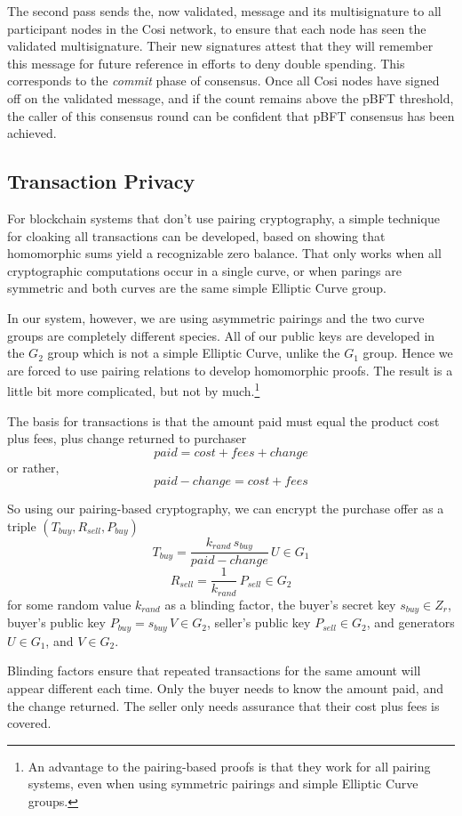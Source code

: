 \documentclass{yellowpaper}
\begin{document}
The second pass sends the, now validated, message and its multisignature to all participant nodes in the Cosi network, to ensure that each node has seen the validated multisignature. Their new signatures attest that they will remember this message for future reference in efforts to deny double spending. This corresponds to the {\em{commit}} phase of consensus. Once all Cosi nodes have signed off on the validated message, and if the count remains above the pBFT threshold, the caller of this consensus round can be confident that pBFT consensus has been achieved.
\subsection{Transaction Privacy}
For blockchain systems that don't use pairing cryptography, a simple technique for cloaking all transactions can be developed, based on showing that homomorphic sums yield a recognizable zero balance. That only works when all cryptographic computations occur in a single curve, or when parings are symmetric and both curves are the same simple Elliptic Curve group.

In our system, however, we are using asymmetric pairings and the two curve groups are completely different species. All of our public keys are developed in the $G_2$ group which is not a simple Elliptic Curve, unlike the $G_1$ group. Hence we are forced to use pairing relations to develop homomorphic proofs. The result is a little bit more complicated, but not by much.\footnote{An advantage to the pairing-based proofs is that they work for all pairing systems, even when using symmetric pairings and simple Elliptic Curve groups.}

The basis for transactions is that the amount paid must equal the product cost plus fees, plus change returned to purchaser
$$ {paid} = {cost} + {fees} + {change}$$
or rather, 
$$ {paid} - {change} = {cost} + {fees}$$

So using our pairing-based cryptography, we can encrypt the purchase offer as a triple 
$(T_{buy},R_{sell}, P_{buy})$
$$ T_{buy} = \frac{k_{rand} \, s_{buy}}{paid - change} \, U \in G_1$$
$$ R_{sell} = \frac{1}{k_{rand}}\,P_{sell} \in G_2$$
for some random value $k_{rand}$ as a blinding factor, the buyer's secret key $s_{buy} \in Z_r$, buyer's public key $P_{buy} = s_{buy} \, V \in G_2$,  seller's public key $P_{sell} \in G_2$, and generators $U \in G_1$, and $V \in G_2$.

Blinding factors ensure that repeated transactions for the same amount will appear different each time. Only the buyer needs to know the amount paid, and the change returned. The seller only needs assurance that their cost plus fees is covered.
\end{document}
